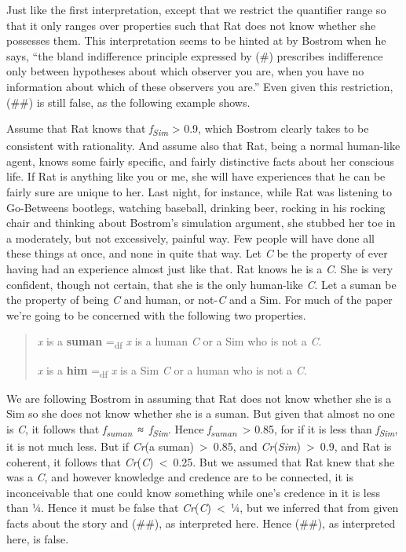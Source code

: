 \documentclass[
  10pt,
  letterpaper,
  DIV=11,
  numbers=noendperiod,
  twoside]{scrartcl}
\begin{document}
Just like the first interpretation, except that we restrict the
quantifier range so that it only ranges over properties such that Rat
does not know whether she possesses them. This interpretation seems to
be hinted at by Bostrom when he says, ``the bland indifference principle
expressed by (\#) prescribes indifference only between hypotheses about
which observer you are, when you have no information about which of
these observers you are.'' Even given this restriction, (\#\#) is still
false, as the following example shows.

Assume that Rat knows that \emph{f\textsubscript{Sim}} \textgreater{}
0.9, which Bostrom clearly takes to be consistent with rationality. And
assume also that Rat, being a normal human-like agent, knows some fairly
specific, and fairly distinctive facts about her conscious life. If Rat
is anything like you or me, she will have experiences that he can be
fairly sure are unique to her. Last night, for instance, while Rat was
listening to Go-Betweens bootlegs, watching baseball, drinking beer,
rocking in his rocking chair and thinking about Bostrom's simulation
argument, she stubbed her toe in a moderately, but not excessively,
painful way. Few people will have done all these things at once, and
none in quite that way. Let \emph{C} be the property of ever having had
an experience almost just like that. Rat knows he is a \emph{C}. She is
very confident, though not certain, that she is the only human-like
\emph{C}. Let a suman be the property of being \emph{C} and human, or
not-\emph{C} and a Sim. For much of the paper we're going to be
concerned with the following two properties.

\begin{quote}
\emph{x} is a \textbf{suman} =\textsubscript{df} \emph{x} is a human
\emph{C} or a Sim who is not a \emph{C}.

\emph{x} is a \textbf{him} =\textsubscript{df} \emph{x} is a Sim
\emph{C} or a human who is not a \emph{C}.
\end{quote}

We are following Bostrom in assuming that Rat does not know whether she
is a Sim so she does not know whether she is a suman. But given that
almost no one is \emph{C}, it follows that
\emph{f\textsubscript{suman}}~≈~\emph{f\textsubscript{Sim}}. Hence
\emph{f\textsubscript{suman}}~\textgreater{} 0.85, for if it is less
than \emph{f\textsubscript{Sim}}, it is not much less. But if
\emph{Cr}(a suman)~\textgreater~0.85, and
\emph{Cr}(\emph{Sim})~\textgreater~0.9, and Rat is coherent, it follows
that \emph{Cr}(\emph{C})~\textless~0.25. But we assumed that Rat knew
that she was a \emph{C}, and however knowledge and credence are to be
connected, it is inconceivable that one could know something while one's
credence in it is less than ¼. Hence it must be false that
\emph{Cr}(\emph{C})~\textless~¼, but we inferred that from given facts
about the story and (\#\#), as interpreted here. Hence (\#\#), as
interpreted here, is false.
\end{document}
